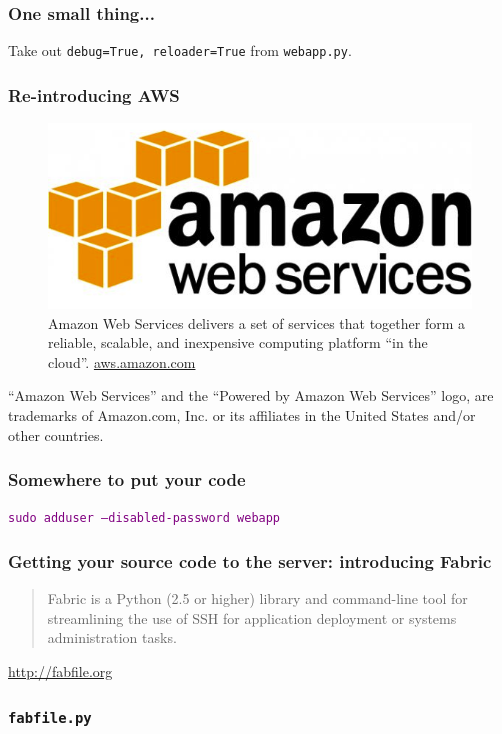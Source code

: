 \documentclass{beamer}
\newcommand\aws[1]{\textcolor{purple}{\texttt{#1}}}
\begin{document}
\begin{frame}
  \frametitle{One small thing...}
  Take out \texttt{debug=True, reloader=True} from \texttt{webapp.py}.
\end{frame}

\begin{frame}
  \frametitle{Re-introducing AWS}
  \begin{figure}[h!]
    \centering
    \includegraphics[scale=0.4]{imgs/aws_logo.png}
    \caption{Amazon Web Services delivers a set of services that together form a reliable, scalable, and inexpensive computing platform ``in the cloud''. \url{aws.amazon.com}}
    \label{fig:aws_logo}
  \end{figure}

  {\tiny ``Amazon Web Services'' and the ``Powered by Amazon Web
    Services'' logo, are trademarks of Amazon.com, Inc. or its
    affiliates in the United States and/or other countries.}
\end{frame}

\begin{frame}[fragile]
  \frametitle{Somewhere to put your code}

  \aws{sudo adduser --disabled-password webapp}

\end{frame}

\begin{frame}
  \frametitle{Getting your source code to the server: introducing
    Fabric}

  \begin{quote}
  Fabric is a Python (2.5 or higher) library and command-line tool for
  streamlining the use of SSH for application deployment or systems
  administration tasks.
  \end{quote}

  \url{http://fabfile.org}

\end{frame}

\begin{frame}
  \frametitle{\texttt{fabfile.py}}
  \inputminted{python}{../steps/04-deployment/01-demo-app/fabfile.py}
\end{frame}
\end{document}
